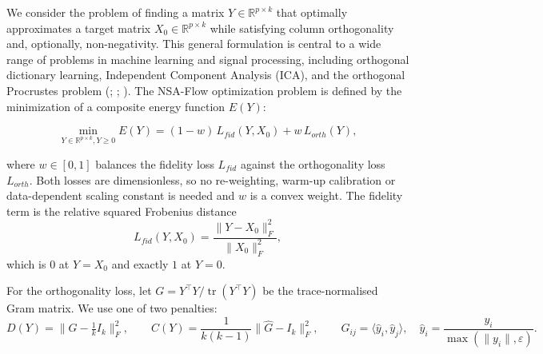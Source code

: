 \documentclass[
]{article}
\begin{document}
We consider the problem of finding a matrix \(Y \in \mathbb{R}^{p \times k}\) that optimally approximates a target matrix \(X_0 \in \mathbb{R}^{p \times k}\) while satisfying column orthogonality and, optionally, non-negativity. This general formulation is central to a wide range of problems in machine learning and signal processing, including orthogonal dictionary learning, Independent Component Analysis (ICA), and the orthogonal Procrustes problem (; ; ). The NSA-Flow optimization problem is defined by the minimization of a composite energy function \(E(Y)\):

\[
\min_{Y \in \mathbb{R}^{p \times k}, Y \ge 0}
E(Y)
= (1 - w) \, L_{fid}(Y, X_0)
+ w \, L_{orth}(Y),
\label{eq:objective}
\]

where \(w \in [0, 1]\) balances the fidelity loss \(L_{fid}\) against the orthogonality loss \(L_{orth}\). Both losses are dimensionless, so no re-weighting, warm-up calibration or data-dependent scaling constant is needed and \(w\) is a convex weight. The fidelity term is the relative squared Frobenius distance
\[
L_{fid}(Y, X_0) = \frac{\| Y - X_0 \|_F^2}{\| X_0 \|_F^2},
\]
which is \(0\) at \(Y = X_0\) and exactly \(1\) at \(Y = 0\).

For the orthogonality loss, let \(G = Y^\top Y / \operatorname{tr}(Y^\top Y)\) be the trace-normalised Gram matrix. We use one of two penalties:
\[
D(Y) = \Big\| G - \tfrac{1}{k} I_k \Big\|_F^2,
\qquad
C(Y) = \frac{1}{k(k-1)} \big\| \widehat{G} - I_k \big\|_F^2,
\qquad
\widehat{G}_{ij} = \langle \hat y_i, \hat y_j \rangle,
\quad
\hat y_i = \frac{y_i}{\max(\|y_i\|, \varepsilon)} .
\]
\end{document}
